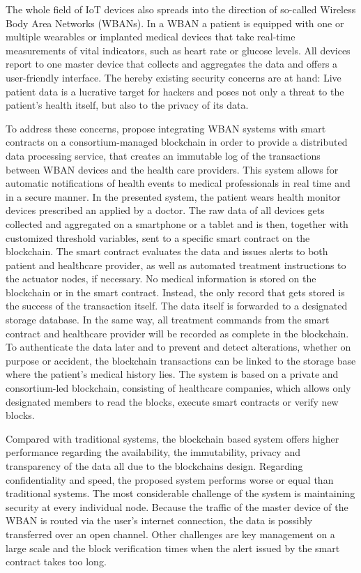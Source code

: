 The whole field of IoT devices also spreads into the direction of so-called Wireless Body Area Networks (WBANs). In a WBAN a patient is equipped with one or multiple wearables or implanted medical devices that take real-time measurements of vital indicators, such as heart rate or glucose levels. All devices report to one master device that collects and aggregates the data and offers a user-friendly interface.
The hereby existing security concerns are at hand: Live patient data is a lucrative target for hackers and poses not only a threat to the patient's health itself, but also to the privacy of its data.

To address these concerns, \citeauthor{Baccarini2018} propose integrating WBAN systems with smart contracts on a consortium-managed blockchain in order to provide a distributed data processing service, that creates an immutable log of the transactions between WBAN devices and the health care providers. This system allows for automatic notifications of health events to medical professionals in real time and in a secure manner.
In the presented system, the patient wears health monitor devices prescribed an applied by a doctor. The raw data of all devices gets collected and aggregated on a smartphone or a tablet and is then, together with customized threshold variables, sent to a specific smart contract on the blockchain. The smart contract evaluates the data and issues alerts to both patient and healthcare provider, as well as automated treatment instructions to the actuator nodes, if necessary.
No medical information is stored on the blockchain or in the smart contract. Instead, the only record that gets stored is the success of the transaction itself. The data itself is forwarded to a designated storage database. In the same way, all treatment commands from the smart contract and healthcare provider will be recorded as complete in the blockchain.
To authenticate the data later and to prevent and detect alterations, whether on purpose or accident, the blockchain transactions can be linked to the storage base where the patient's medical history lies.
The system is based on a private and consortium-led blockchain, consisting of healthcare companies, which allows only designated members to read the blocks, execute smart contracts or verify new blocks.

Compared with traditional systems, the blockchain based system offers higher performance regarding the availability, the immutability, privacy and transparency of the data  all due to the blockchains design. Regarding confidentiality and speed, the proposed system performs worse or equal than traditional systems.
The most considerable challenge of the system is maintaining security at every individual node. Because the traffic of the master device of the WBAN is routed via the user's internet connection, the data is possibly transferred over an open channel.  Other challenges are key management on a large scale and the block verification times when the alert issued by the smart contract takes too long.


